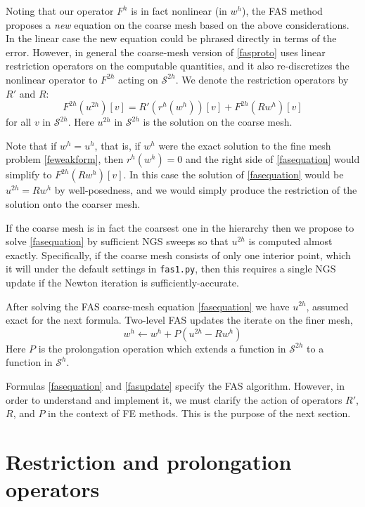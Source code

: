 \documentclass[letterpaper,final,12pt,reqno]{amsart}
\begin{document}
Noting that our operator $F^h$ is in fact nonlinear (in $w^h$), the FAS method  proposes a \emph{new} equation on the coarse mesh based on the above considerations.  In the linear case the new equation could be phrased directly in terms of the error.  However, in general the coarse-mesh version of \eqref{fasproto} uses linear restriction operators on the computable quantities, and it also re-discretizes the nonlinear operator to $F^{2h}$ acting on $\mathcal{S}^{2h}$.  We denote the restriction operators by $R'$ and $R$:
\begin{equation}
  F^{2h}(u^{2h})[v] = R' (r^h(w^h))[v] + F^{2h}(R w^h)[v] \label{fasequation}
\end{equation}
for all $v$ in $\mathcal{S}^{2h}$.  Here $u^{2h}$ in $\mathcal{S}^{2h}$ is the solution on the coarse mesh.

Note that if $w^h=u^h$, that is, if $w^h$ were the exact solution to the fine mesh problem \eqref{feweakform}, then $r^h(w^h)=0$ and the right side of \eqref{fasequation} would simplify to $F^{2h}(R w^h)[v]$.  In this case the solution of \eqref{fasequation} would be $u^{2h} = R w^h$ by well-posedness, and we would simply produce the restriction of the solution onto the coarser mesh.

If the coarse mesh is in fact the coarsest one in the hierarchy then we propose to solve \eqref{fasequation} by sufficient NGS sweeps so that $u^{2h}$ is computed almost exactly.  Specifically, if the coarse mesh consists of only one interior point, which it will under the default settings in \texttt{fas1.py}, then this requires a single NGS update if the Newton iteration is sufficiently-accurate.

After solving the FAS coarse-mesh equation \eqref{fasequation} we have $u^{2h}$, assumed exact for the next formula.  Two-level FAS updates the iterate on the finer mesh,
\begin{equation}
  w^h \longleftarrow w^h + P(u^{2h} - R w^h) \label{fasupdate}
\end{equation}
Here $P$ is the prolongation operation which extends a function in $\mathcal{S}^{2h}$ to a function in $\mathcal{S}^h$.

Formulas \eqref{fasequation} and \eqref{fasupdate} specify the FAS algorithm.  However, in order to understand and implement it, we must clarify the action of operators $R'$, $R$, and $P$ in the context of FE methods.  This is the purpose of the next section.


\section{Restriction and prolongation operators}
\end{document}
